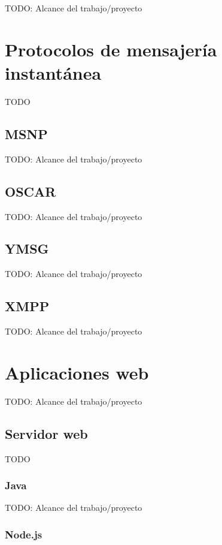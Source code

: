 TODO: Alcance del trabajo/proyecto

\section{Protocolos de mensajería instantánea}

TODO

\subsection{MSNP}

TODO: Alcance del trabajo/proyecto

\subsection{OSCAR}

TODO: Alcance del trabajo/proyecto

\subsection{YMSG}

TODO: Alcance del trabajo/proyecto

\subsection{XMPP}

TODO: Alcance del trabajo/proyecto

\section{Aplicaciones web}

TODO: Alcance del trabajo/proyecto

\subsection{Servidor web}

TODO

\subsubsection{Java}

TODO: Alcance del trabajo/proyecto

\subsubsection{Node.js}

